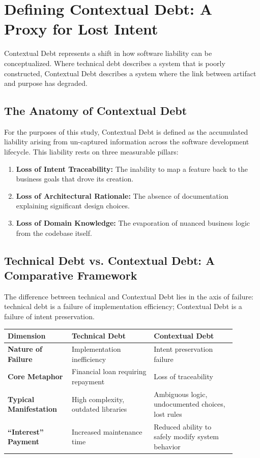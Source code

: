 \documentclass[11pt, a4paper]{article}
\begin{document}
\section{Defining Contextual Debt: A Proxy for Lost Intent}

Contextual Debt represents a shift in how software liability can be conceptualized. Where technical debt describes a system that is poorly constructed, Contextual Debt describes a system where the link between artifact and purpose has degraded.

\subsection{The Anatomy of Contextual Debt}

For the purposes of this study, Contextual Debt is defined as the accumulated liability arising from un-captured information across the software development lifecycle. This liability rests on three measurable pillars:

\begin{enumerate}[leftmargin=*]
  \item \textbf{Loss of Intent Traceability:} The inability to map a feature back to the business goals that drove its creation.
  \item \textbf{Loss of Architectural Rationale:} The absence of documentation explaining significant design choices.
  \item \textbf{Loss of Domain Knowledge:} The evaporation of nuanced business logic from the codebase itself.
\end{enumerate}

\subsection{Technical Debt vs. Contextual Debt: A Comparative Framework}

The difference between technical and Contextual Debt lies in the axis of failure: technical debt is a failure of implementation efficiency; Contextual Debt is a failure of intent preservation.

\begin{table}[h]
\centering
\small
\begin{tabular}{@{}p{0.25\linewidth}p{0.32\linewidth}p{0.32\linewidth}@{}}
\toprule
\textbf{Dimension} & \textbf{Technical Debt} & \textbf{Contextual Debt} \\
\midrule
\textbf{Nature of Failure} & Implementation inefficiency & Intent preservation failure \\
\textbf{Core Metaphor} & Financial loan requiring repayment & Loss of traceability \\
\textbf{Typical Manifestation} & High complexity, outdated libraries & Ambiguous logic, undocumented choices, lost rules \\
\textbf{``Interest'' Payment} & Increased maintenance time & Reduced ability to safely modify system behavior \\
\bottomrule
\end{tabular}
\end{table}
\end{document}
